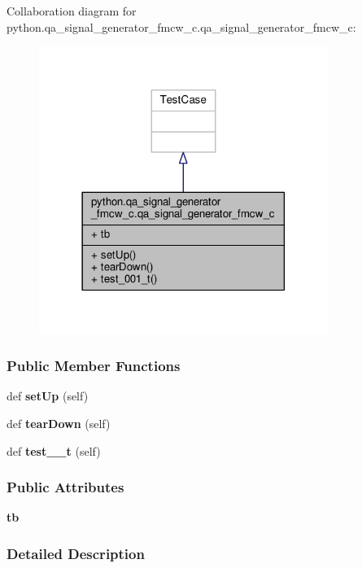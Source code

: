 Collaboration diagram for python.\+qa\+\_\+signal\+\_\+generator\+\_\+fmcw\+\_\+c.\+qa\+\_\+signal\+\_\+generator\+\_\+fmcw\+\_\+c\+:
\nopagebreak
\begin{figure}[H]
\begin{center}
\leavevmode
\includegraphics[width=266pt]{de/d23/classpython_1_1qa__signal__generator__fmcw__c_1_1qa__signal__generator__fmcw__c__coll__graph}
\end{center}
\end{figure}
\subsubsection*{Public Member Functions}
\begin{DoxyCompactItemize}
\item 
def {\bf set\+Up} (self)
\item 
def {\bf tear\+Down} (self)
\item 
def {\bf test\+\_\+\_\+t} (self)
\end{DoxyCompactItemize}
\subsubsection*{Public Attributes}
\begin{DoxyCompactItemize}
\item 
{\bf tb}
\end{DoxyCompactItemize}


\subsubsection{Detailed Description}


